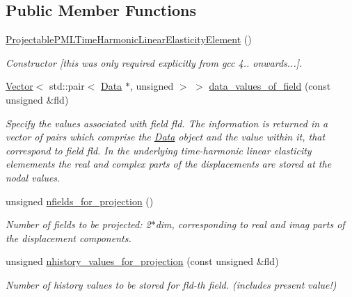 \subsection*{Public Member Functions}
\begin{DoxyCompactItemize}
\item 
\hyperlink{classoomph_1_1ProjectablePMLTimeHarmonicLinearElasticityElement_a6830283db23845b013e377e499b0daed}{Projectable\+P\+M\+L\+Time\+Harmonic\+Linear\+Elasticity\+Element} ()
\begin{DoxyCompactList}\small\item\em Constructor \mbox{[}this was only required explicitly from gcc 4.. onwards...\mbox{]}. \end{DoxyCompactList}\item 
\hyperlink{classoomph_1_1Vector}{Vector}$<$ std\+::pair$<$ \hyperlink{classoomph_1_1Data}{Data} $\ast$, unsigned $>$ $>$ \hyperlink{classoomph_1_1ProjectablePMLTimeHarmonicLinearElasticityElement_a49e06b240732712d0db73340c9f104f0}{data\+\_\+values\+\_\+of\+\_\+field} (const unsigned \&fld)
\begin{DoxyCompactList}\small\item\em Specify the values associated with field fld. The information is returned in a vector of pairs which comprise the \hyperlink{classoomph_1_1Data}{Data} object and the value within it, that correspond to field fld. In the underlying time-\/harmonic linear elasticity elemements the real and complex parts of the displacements are stored at the nodal values. \end{DoxyCompactList}\item 
unsigned \hyperlink{classoomph_1_1ProjectablePMLTimeHarmonicLinearElasticityElement_a4f47d55d9864a060d434bdf1fcf0ebe1}{nfields\+\_\+for\+\_\+projection} ()
\begin{DoxyCompactList}\small\item\em Number of fields to be projected\+: 2$\ast$dim, corresponding to real and imag parts of the displacement components. \end{DoxyCompactList}\item 
unsigned \hyperlink{classoomph_1_1ProjectablePMLTimeHarmonicLinearElasticityElement_a0b75e51a7ed1b8bb56238134b2c02dae}{nhistory\+\_\+values\+\_\+for\+\_\+projection} (const unsigned \&fld)
\begin{DoxyCompactList}\small\item\em Number of history values to be stored for fld-\/th field. (includes present value!) \end{DoxyCompactList}\item 

\end{DoxyCompactItemize}
